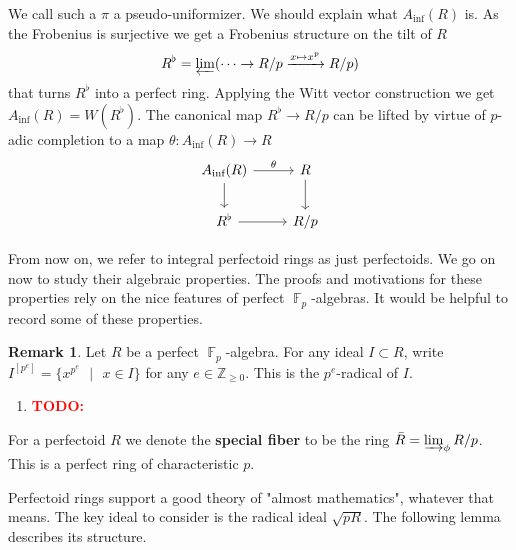 \documentclass[12pt]{amsproc}
\theoremstyle{definition}
\newtheorem*{remark}{Remark}
\newcommand{\Z}{\mathbb{Z}}
\newcommand{\ra}{\rightarrow}
\newcommand{\xra}{\xrightarrow}
\DeclareMathOperator{\invlim}{\varprojlim}
\DeclareMathOperator{\dirlim}{\varinjlim}
\DeclareMathOperator{\F}{\mathbb{F}}
\newcommand{\todo}[1]{\textcolor{red}{\textbf{TODO:}\text{[#1]}}}
\begin{document}
We call such a $\pi$ a pseudo-uniformizer. We should explain what $A_\text{inf}(R)$ is. As the Frobenius is surjective we get a Frobenius structure on the tilt of $R$
\[	R^\flat=\invlim(\cdots\ra R/p\xra{x\mapsto x^p} R/p)	\]
that turns $R^\flat$ into a perfect ring. Applying the Witt vector construction we get $A_\text{inf}(R)=W(R^\flat)$. The canonical map $R^\flat\ra R/p$ can be lifted by virtue of $p$-adic completion to a map $\theta:A_\text{inf}(R)\ra R$
\[\begin{tikzcd}
A_\text{inf}(R)\arrow[r, "\theta"]\arrow[d]& R\arrow[d]\\
R^\flat\arrow[r]&R/p
\end{tikzcd}\]

From now on, we refer to integral perfectoid rings as just perfectoids. We go on now to study their algebraic properties. The proofs and motivations for these properties rely on the nice features of perfect $\F_p$-algebras. It would be helpful to record some of these properties.

\begin{remark}
Let $R$ be a perfect $\F_p$-algebra. For any ideal $I\subset R$, write $I^{[p^e]}=\{x^{p^e}\text{ }|\text{ }x\in I\}$ for any $e\in\Z_{\ge 0}$. This is the $p^e$-radical of $I$.
\begin{enumerate}
\item \todo{fill it in}
\end{enumerate}
\end{remark}

For a perfectoid $R$ we denote the \textbf{special fiber} to be the ring $\bar{R}=\dirlim_\phi R/p$. This is a perfect ring of characteristic $p$.

Perfectoid rings support a good theory of "almost mathematics", whatever that means. The key ideal to consider is the radical ideal $\sqrt{pR}$. The following lemma describes its structure.
\end{document}
